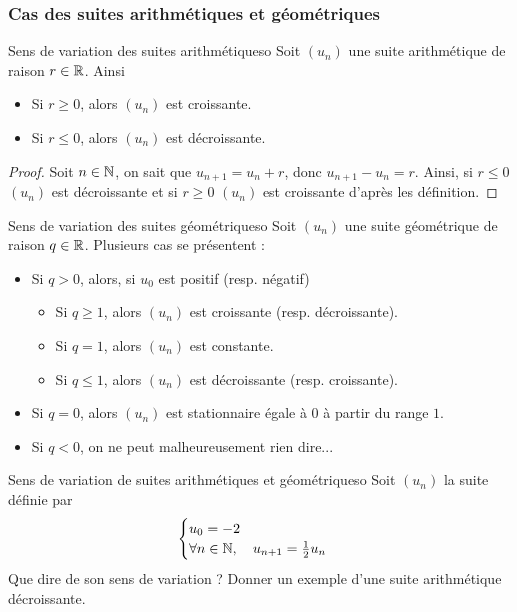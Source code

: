 \subsubsection{Cas des suites arithmétiques et géométriques}

\begin{proposition}{Sens de variation des suites arithmétiques}{o}
Soit $(u_n)$ une suite arithmétique de raison $r\in\mathbb{R}$. Ainsi 
\begin{itemize}
	\item Si $r\geq 0$, alors $(u_n)$ est croissante.
	\item Si $r\leq 0$, alors $(u_n)$ est décroissante.
\end{itemize}
\end{proposition}
\begin{proof}
Soit $n\in\mathbb{N}$, on sait que $u_{n+1}=u_n+r$, donc $u_{n+1}-u_n=r$. Ainsi, si $r\leq 0$ $(u_n)$ est décroissante et si $r\geq 0$ $(u_n)$ est croissante d'après les définition.
\end{proof}

\begin{proposition}{Sens de variation des suites géométriques}{o}
Soit $(u_n)$ une suite géométrique de raison $q\in\mathbb{R}$. Plusieurs cas se présentent : 
\begin{itemize}
	\item Si $q > 0$, alors, si $u_0$ est positif (resp. négatif) 
	\begin{itemize}
		\item Si $q \geq 1$, alors $(u_n)$ est croissante (resp. décroissante).
		\item Si $q = 1$, alors $(u_n)$ est constante.
		\item Si $q \leq 1$, alors $(u_n)$ est décroissante (resp. croissante).
	\end{itemize}
	\item Si $q = 0$, alors $(u_n)$ est stationnaire égale à $0$ à partir du range $1$.
	\item Si $q < 0$, on ne peut malheureusement rien dire...
\end{itemize}
\end{proposition}

\begin{exemple}{Sens de variation de suites arithmétiques et géométriques}{o}
	Soit $(u_n)$ la suite définie par \[\begin{cases}u_0=-2\\ \forall n\in\mathbb{N},\quad u_{n+1}=\frac12 u_n\end{cases}\]
	Que dire de son sens de variation ? Donner un exemple d'une suite arithmétique décroissante. 
\end{exemple}

